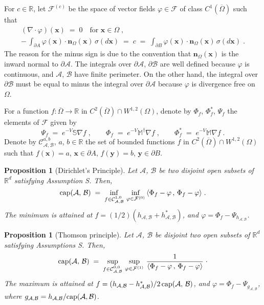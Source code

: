 \documentclass[reqno]{amsart}
\newtheorem{proposition}[theorem]{Proposition}
\newcounter{as}[section]
\newcommand{\mc}[1]{{\mathcal #1}}
\newcommand{\bb}[1]{{\mathbb #1}}
\newcommand{\bs}[1]{{\boldsymbol #1}}
\newcommand{\<}{\langle}
\renewcommand{\>}{\rangle}
\renewcommand{\Cap}{{\rm cap}}
\begin{document}
For $c\in \bb R$, let $\mathcal F^{(c)}$ be the space of vector fields
$\varphi \in \mathcal F$ of class $C^1(\overline{\Omega})$ such that
\begin{gather}
(\nabla \cdot \varphi) (\bs{x}) \;=\; 0 \quad\text{for $\bs x\in \Omega$}\;, \label{gg1} \\
-\, \int_{\partial A} \varphi (\bs{x}) \cdot \bs n_\Omega (\bs{x}) \,
\sigma(d\bs{x}) \;=\; c \;=\; \int_{\partial B} \varphi (\bs{x})
\cdot \bs n_\Omega(\bs{x}) \, \sigma(d\bs{x}) \;.\label{gg2}
\end{gather}
The reason for the minus sign is due to the convention that $\bs
n_\Omega(\bs{x})$ is the inward normal to $\partial \mc A$. The integrals over
$\partial \mc A$, $\partial \mc B$ are well defined because $\varphi$ is
continuous, and $\mc A$, $\mc B$ have finite perimeter. On the other hand, the
integral over $\partial \mc B$ must be equal to minus the integral over
$\partial \mc A$ because $\varphi$ is divergence free on $\Omega$.

For a function $f \colon \overline{\Omega} \to \bb R$ in
$C^2(\overline{\Omega})\cap W^{1,2}(\Omega)$, denote by
$\Phi_f$, $\Phi^*_f$, $\Psi_f$ the elements of $\mathcal F$ given by
\begin{equation}
\label{2-3}
\Psi_f \;=\; e^{-V} \bb S \nabla f\;, \qquad
\Phi_f \;=\; e^{-V} \bb M^\dagger \nabla f \;, \qquad
\Phi^*_f \;=\; e^{-V} \bb M \nabla f\;.
\end{equation}
Denote by $\mathcal C^{a,b}_{\mc A,\mc B}$, $a$, $b\in \bb R$ the set of
bounded functions $f$ in $C^2(\overline{\Omega})\cap W^{1,2}(\Omega)$
such that $f(\bs{x})=a$, $\bs x\in \partial A$, $f(\bs{y})=b$, $\bs y\in \partial B$.

\begin{proposition}[Dirichlet's Principle]
\label{prop1}
Let $\mc A$, $\mc B$ be two disjoint open subsets of $\bb R^d$ satisfying Assumption S. Then,
\begin{equation}
\label{26}
\Cap (\mc A,\,\mc B) \;=\; \inf_{f\in \mathcal C^{1,0}_{\mc A,\mc B}}
\, \inf_{\varphi \in \mathcal  F^{(0)}} \,
\< \Phi_f - \varphi \,,\, \Phi_f - \varphi \>\;.
\end{equation}
The minimum is attained at $f=(1/2) (h_{\mc A,\mc B} + h^*_{\mc A,\mc B})$, and
$\varphi = \Phi_f - \Psi_{h_{\mc A,\mc B}}$.
\end{proposition}

\begin{proposition}[Thomson principle]
\label{prop2}
Let $\mc A$, $\mc B$ be disjoint two open subsets of $\bb R^d$ satisfying Assumptions S. Then,
\begin{equation}
\label{28}
\Cap (\mc A,\,\mc B) \;=\; \sup_{f\in \mathcal C^{0,0}_{\mc A,\mc B}} \,
\sup_{\varphi \in \mathcal  F^{(1)}} \,
\frac 1{\< \Phi_f - \varphi \,,\, \Phi_f - \varphi \>} \;\cdot
\end{equation}
The maximum is attained at $f=(h_{\mc A,\mc B} - h^*_{\mc A,\mc B})/2 \, \Cap (\mc A,\,\mc B)$, and
$\varphi = \Phi_f - \Psi_{g_{\mc A,\mc B}}$, where $g_{\mc A,\mc B} = h_{\mc A,\mc B}/\Cap
(\mc A,\mc B)$.
\end{proposition}
\end{document}
